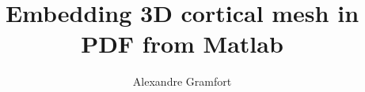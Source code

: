 \documentclass[a4paper]{article}
\begin{document}
\title{Embedding 3D cortical mesh in PDF from Matlab}
\author{Alexandre Gramfort}

\end{document}
